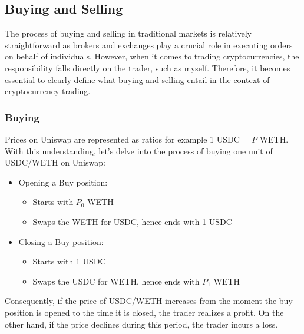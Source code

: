 \subsection{Buying and Selling}
The process of buying and selling in traditional markets is relatively straightforward as brokers and exchanges play a crucial role in executing orders on behalf of individuals. However, when it comes to trading cryptocurrencies, the responsibility falls directly on the trader, such as myself. Therefore, it becomes essential to clearly define what buying and selling entail in the context of cryptocurrency trading.

\subsubsection{Buying}
Prices on Uniswap are represented as ratios for example 1 USDC = $P$ WETH. With this understanding, let's delve into the process of buying one unit of USDC/WETH on Uniswap:
\begin{itemize}
    \item Opening a Buy position:\begin{itemize}
        \item Starts with $P_{0}$ WETH
        \item Swaps the WETH for USDC, hence ends with 1 USDC
    \end{itemize}
    \item Closing a Buy position:\begin{itemize}
        \item Starts with 1 USDC
        \item Swaps the USDC for WETH, hence ends with $P_1$ WETH
    \end{itemize}
\end{itemize}
\noindent Consequently, if the price of USDC/WETH increases from the moment the buy position is opened to the time it is closed, the trader realizes a profit. On the other hand, if the price declines during this period, the trader incurs a loss.

